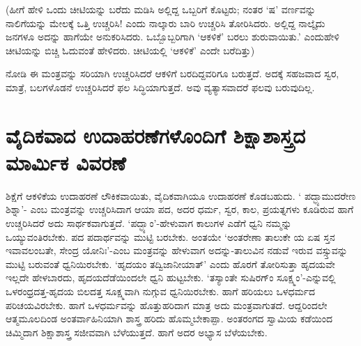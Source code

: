 (ಹೀಗೆ ಹೇಳಿ ಒಂದು ಚೀಟಿಯನ್ನು ಬರೆದು ಮಡಿಸಿ ಅಲ್ಲಿದ್ದ ಒಬ್ಬರಿಗೆ ಕೊಟ್ಟರು; ನಂತರ `ಷ' ವರ್ಣವನ್ನು ನಾಲಿಗೆಯನ್ನು ಮೇಲಕ್ಕೆ  ಒತ್ತಿ ಉಚ್ಚರಿಸಿ! ಎಂದು ನಾಲ್ಕಾರು ಬಾರಿ ಉಚ್ಚರಿಸಿ ತೋರಿಸಿದರು. ಅಲ್ಲಿದ್ದ ನಾಲ್ಕೈದು ಜನಗಳೂ ಅದನ್ನು ಹಾಗೆಯೇ ಅನುಕರಿಸಿದರು. ಒಬ್ಬೊಬ್ಬರಿಗಾಗಿ `ಆಕಳಿಕೆ' ಬರಲು ಶುರುವಾಯಿತು.' ಎಂದುಹೇಳಿ ಚೀಟಿಯನ್ನು ಬಿಚ್ಚಿ ಓದುವಂತೆ ಹೇಳಿದರು. ಚೀಟಿಯಲ್ಲಿ `ಆಕಳಿಕೆ' ಎಂದೇ ಬರೆದಿತ್ತು)

ನೋಡಿ ಈ ಮಂತ್ರವನ್ನು ಸರಿಯಾಗಿ ಉಚ್ಚರಿಸಿದರೆ ಆಕಳಿಗೆ ಬರದಿದ್ದವರಿಗೂ ಬರುತ್ತದೆ. ಅದಕ್ಕೆ ಸಹಜವಾದ ಸ್ವರ, ಮಾತ್ರೆ, ಬಲಗಳೊಡನೆ ಉಚ್ಚರಿಸಿದರೆ ಫಲ ಸಿದ್ಧಿಯಾಗುತ್ತದೆ. ಅವು ವ್ಯತ್ಯಾಸವಾದರೆ ಫಲವು ಬರುವುದಿಲ್ಲ.

\section*{ವೈದಿಕವಾದ ಉದಾಹರಣೆಗಳೊಂದಿಗೆ ಶಿಕ್ಷಾಶಾಸ್ತ್ರದ ಮಾರ್ಮಿಕ ವಿವರಣೆ}

ಶಿಕ್ಷೆಗೆ ಆಕಳಿಕೆಯ ಉದಾಹರಣೆ ಲೌಕಿಕವಾಯಿತು, ವೈದಿಕವಾಗಿಯೂ ಉದಾಹರಣೆ ಕೊಡಬಹುದು. ` ಪದ್ಭ್ಯಾಮುದರೇಣ ಶಿಶ್ನಾ'- ಎಂಬ ಮಂತ್ರವನ್ನು ಉಚ್ಚರಿಸಿದಾಗ ಆಯಾ ಪದ, ಅದರ ಧರ್ಮ, ಸ್ವರ, ಕಾಲ, ಪ್ರಯತ್ನಗಳು ಕೂಡಿರುವ ಹಾಗೆ ಉಚ್ಚರಿಸಿದರೆ ಅದು ಸಾರ್ಥಕವಾಗುತ್ತದೆ. `ಪದ್ಭ್ಯಾಂ'-ಹೇಳುವಾಗ ಕಾಲುಗಳ ಎಡೆಗೆ ಧ್ವನಿ ನಮ್ಮನ್ನು ಒಯ್ಯುವಂತಿರಬೇಕು. ಪದ ಪದಾರ್ಥವನ್ನು ಮುಟ್ಟಿ ಬರಬೇಕು. ಅಂತಯೇ `ಅಂತರೇಣಾ ತಾಲುಕೇ ಯ ಏಷ ಸ್ತನ ಇವಾವಲಂಬತೇ, ಸೇಂದ್ರ ಯೋನಿಃ'-ಎಂಬ ಮಂತ್ರವನ್ನು ಹೇಳುವಾಗ ಅದನ್ನು-ತಾಲುವಿನ ನಡುವೆ ಇರುವ ವಸ್ಸ್ತುವನ್ನು ಮುಟ್ಟಿ ಬರುವಂತೆ ಧ್ವನಿಯಿರಬೇಕು. `ಹೃದಯಂ ತದ್ವಿಜಾನೀಯಾತ್' ಎಂದು ಹೊರಗೆ ತೋರಿಸುತ್ತಾ ಹೃದಯವೇ ಇಲ್ಲದೇ ಹೇಳಬಾರದು, ಹೃದಯದೆಡೆಯಿಂದಲೇ ಧ್ವನಿ ಹುಟ್ಟಬೇಕು. `ತಸ್ಯಾಂತೇ ಸುಷಿರಗ್ಂ ಸೂಕ್ಷ್ಮಂ'-ಎನ್ನುವಲ್ಲಿ ಒಳರಂಧ್ರದತ್ತ-ಹೃದಯ ಬಿಲದತ್ತ ಸೂಕ್ಷ್ಮವಾಗಿ ನುಗ್ಗುವ ಧ್ವನಿಯಿರಬೇಕು. ಹಾಗೆ ಹರಿಯಲು ಒಳಧರ್ಮದ ಪರಿಚಯವಿರಬೇಕು. ಹಾಗೆ ಒಳಧರ್ಮವನ್ನು ಹೊತ್ತುಹರಿದಾಗ ಮಾತ್ರ ಅದು ಮಂತ್ರವಾಗುತದೆ. ಆದ್ದರಿಂದಲೇ ಆತ್ಮಮೂಲದಿಂಡ ಅಂತರ್ವಾಹಿನಿಯಾಗಿ ಶಾಸ್ತ್ರ ಹರಿದು ಹೊಮ್ಮಬೇಕಾಪ್ಪಾ. ಅಂತರಂಗದ ಸ್ವಾಮಿಯ ಕಡೆಯಿಂದ ಚಿಮ್ಮಿದಾಗ ಶಿಕ್ಷಾಶಾಸ್ತ್ರ ಸಜೀವವಾಗಿ ಬೆಳೆಯುತ್ತದೆ. ಹಾಗೆ ಅದರ ಅಭ್ಯಾಸ ಬೆಳೆಯಬೇಕು.


